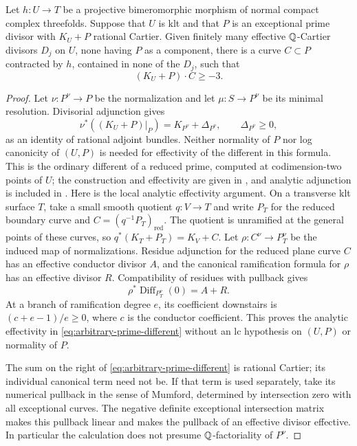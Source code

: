 \begin{lemma}\label{lem:exceptional-surface-curve}
Let $h:U\to T$ be a projective bimeromorphic morphism of normal compact
complex threefolds.  Suppose that $U$ is klt and that $P$ is an exceptional
prime divisor with $K_U+P$ rational Cartier.  Given finitely many effective
$\mathbb Q$-Cartier divisors $D_j$ on $U$, none having $P$ as a component, there
is a curve $C\subset P$ contracted by $h$, contained in none of the $D_j$,
such that
\[
 (K_U+P)\cdot C\geq-3.
\]
\end{lemma}

\begin{proof}
Let $\nu:P^\nu\to P$ be the normalization and let
$\mu:S\to P^\nu$ be its minimal resolution.  Divisorial adjunction gives
\begin{equation}\label{eq:arbitrary-prime-different}
 \nu^*((K_U+P)|_P)=K_{P^\nu}+\Delta_{P^\nu},
 \qquad \Delta_{P^\nu}\geq0,
\end{equation}
as an identity of rational adjoint bundles.  Neither normality of $P$ nor
log canonicity of $(U,P)$ is needed for effectivity of the different in this
formula.  This is the ordinary different of a reduced prime, computed at
codimension-two points of $U$; the construction and effectivity are given in
\cite[Section~14.1(i)--(iii), pp.~40--41]{FujinoFundamental2010},
and analytic adjunction is included in
\cite[Theorem~1.1 and the following setup, p.~1]{FujinoInversion2023}.
Here is the local analytic effectivity argument.  On a transverse klt
surface $T$, take a small smooth quotient $q:V\to T$ and write
$P_T$ for the reduced boundary curve and $C=(q^{-1}P_T)_{\mathrm{red}}$.
The quotient is unramified at the general points of these curves, so
$q^*(K_T+P_T)=K_V+C$.  Let $\rho:C^\nu\to P_T^\nu$ be the induced
map of normalizations.  Residue adjunction for the reduced plane curve
$C$ has an effective conductor divisor $A$, and the canonical
ramification formula for $\rho$ has an effective divisor $R$.
Compatibility of residues with pullback gives
\[
 \rho^*\operatorname{Diff}_{P_T^\nu}(0)=A+R.
\]
At a branch of ramification degree $e$, its coefficient downstairs is
$(c+e-1)/e\geq0$, where $c$ is the conductor coefficient.  This proves
the analytic effectivity in \eqref{eq:arbitrary-prime-different}
without an lc hypothesis on $(U,P)$ or normality of $P$.

The sum on the right of \eqref{eq:arbitrary-prime-different} is rational
Cartier; its individual canonical term need not be.  If that term is used
separately, take its numerical pullback in the sense of Mumford, determined
by intersection zero with all exceptional curves.  The negative definite
exceptional intersection matrix makes this pullback linear and makes the
pullback of an effective divisor effective.  In particular the calculation
does not presume $\mathbb Q$-factoriality of $P^\nu$.


\end{proof}
